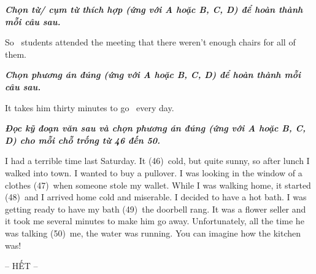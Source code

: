 \documentclass[11pt]{article}
\newcommand{\tieude}[1]{\par{\itshape\textbf{#1}}}
\begin{document}
 \begin{multiplechoice}[ keycolumns=3]
\tieude{Chọn từ/ cụm từ thích hợp (ứng với A hoặc B, C, D) để hoàn thành mỗi câu sau.}%
\begin{question}
So \daugach\ students attended the meeting that there weren’t enough chairs for all of them.
\datcot
\bonpa
{} 
{} 
{} 
{}
\end{question}
\foreachproblem[btcumtu]{\thisproblem}
\end{multiplechoice}

 \begin{multiplechoice}[ keycolumns=3]
\tieude{Chọn phương án đúng (ứng với A hoặc B, C, D) để hoàn thành mỗi câu sau.}%
\begin{question}
It takes him thirty minutes to go \daugach\ every day.
\datcot[2]
\bonpa
{} 
{} 
{} 
{}
\end{question}
 
\foreachproblem[bthoanthanh]{\label{prob:\thisproblemlabel}\thisproblem}
\end{multiplechoice}

 \begin{multiplechoice}[ keycolumns=3]
\tieude{Đọc kỹ đoạn văn sau và chọn phương án đúng (ứng với A hoặc B, C, D) cho mỗi chỗ trống từ 46 đến 50.}

I had a terrible time last Saturday. It (46)\daugach\  cold, but quite sunny, so after lunch I walked into town. I wanted to buy a pullover. I was looking in the window of a clothes (47)\daugach\ when someone stole my wallet. While I was walking home, it started (48)\daugach\ and I arrived home cold and miserable. I decided to have a hot bath. I was getting ready to have my bath (49)\daugach\ the doorbell rang. It was a flower seller and it took me several minutes to make him go away. Unfortunately, all the time he was talking (50)\daugach\ me, the water was running. You can imagine how the kitchen was!
\begin{question}
\datcot
\bonpat
{} 
{} 
{} 
{}
\end{question}
\foreachproblem[btcumtus]{\thisproblem}
\begin{examclosing}
\centerline{-- HẾT --}
\end{examclosing}
\end{multiplechoice}
\end{document}

